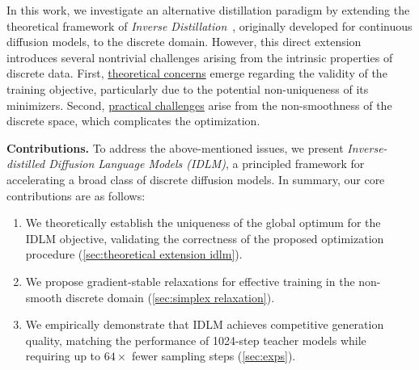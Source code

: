     In this work, we investigate an alternative distillation paradigm by extending the theoretical framework of \emph{Inverse Distillation}~\citep{gushchin2025inverse, kornilov2025universal, selikhanovych2025one}, originally developed for continuous diffusion models, to the discrete domain. However, this direct extension introduces several nontrivial challenges arising from the intrinsic properties of discrete data. First, \underline{theoretical concerns} emerge regarding the validity of the training objective, particularly due to the potential non-uniqueness of its minimizers. Second, \underline{practical challenges} arise from the non-smoothness of the discrete space, which complicates the optimization. 
  
    \textbf{Contributions.} To address the above-mentioned issues, we present \emph{Inverse-distilled Diffusion Language Models (IDLM)}, a principled framework for accelerating a broad class of discrete diffusion models. In summary, our core contributions are as follows:
    \vspace{-0.9em}

    \begin{enumerate}
    \setlength{\itemsep}{1pt}
    \setlength{\parskip}{1pt}
        \item We theoretically establish the uniqueness of the global optimum for the IDLM objective, validating the correctness of the proposed optimization procedure (\wasyparagraph\ref{sec:theoretical extension idlm}).
        \item We propose gradient-stable relaxations for effective training \textcolor{debugcolor}{in the non-smooth discrete domain} (\wasyparagraph\ref{sec:simplex relaxation}).
        \item We empirically demonstrate that IDLM achieves competitive generation quality, matching the performance of 1024-step teacher models while requiring up to $64\times$ fewer sampling steps (\wasyparagraph\ref{sec:exps}).
    \end{enumerate}
